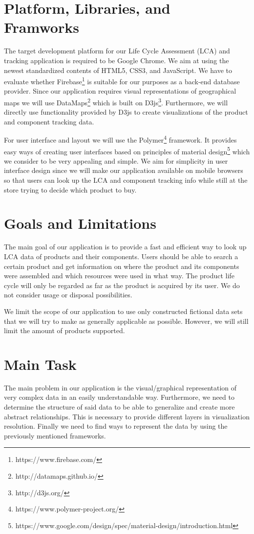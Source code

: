 \documentclass[a4page]{article}
\begin{document}
\section{Platform, Libraries, and Framworks}
The target development platform for our Life Cycle Assessment (LCA) and tracking application is required to be Google Chrome. 
We aim at using the newest standardized contents of HTML5, CSS3, and JavaScript. We have to evaluate whether Firebase\footnote{https://www.firebase.com/} is suitable for our purposes as a back-end database provider.
Since our application requires visual representations of geographical maps we will use DataMaps\footnote{http://datamaps.github.io/} which is built on D3js\footnote{http://d3js.org/}.
Furthermore, we will directly use functionality provided by D3js to create visualizations of the product and component tracking data.

For user interface and layout we will use the Polymer\footnote{https://www.polymer-project.org/} framework. 
It provides easy ways of creating user interfaces based on principles of material design\footnote{https://www.google.com/design/spec/material-design/introduction.html} which we consider to be very appealing and simple.
We aim for simplicity in user interface design since we will make our application available on mobile browsers so that users can look up the \ac{LCA} and component tracking info while still at the store trying to decide which product to buy.

\section{Goals and Limitations}
The main goal of our application is to provide a fast and efficient way to look up \ac{LCA} data of products and their components.
Users should be able to search a certain product and get information on where the product and its components were assembled and which resources were used in what way.
The product life cycle will only be regarded as far as the product is acquired by its user.
We do not consider usage or disposal possibilities. 


We limit the scope of our application to use only constructed fictional data sets that we will try to make as generally applicable as possible. However, we will still limit the amount of products supported.

\section{Main Task}
The main problem in our application is the visual/graphical representation of very complex data in an easily understandable way.
Furthermore, we need to determine the structure of said data to be able to generalize and create more abstract relationships.
This is necessary to provide different layers in visualization resolution.
Finally we need to find ways to represent the data by using the previously mentioned frameworks.
\end{document}
